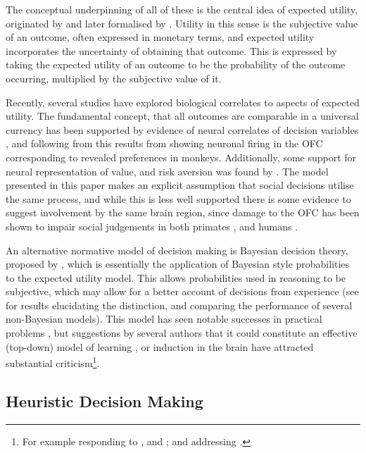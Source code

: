 The conceptual underpinning of all of these is the central idea of expected utility, originated by \citet{Bernoulli1954} and later formalised by \citet{Neumann1953}. Utility in this sense is the subjective value of an outcome, often expressed in monetary terms, and expected utility incorporates the uncertainty of obtaining that outcome. This is expressed by taking the expected utility of an outcome to be the probability of the outcome occurring, multiplied by the subjective value of it.

Recently, several studies have explored biological correlates to aspects of expected utility. The fundamental concept, that all outcomes are comparable in a universal currency has been supported by evidence of neural correlates of decision variables \citep{Platt1999}, and following from this results from \citet{Padoa-Schioppa2006,Padoa-Schioppa2008} showing neuronal firing in the \ac{OFC} corresponding to revealed preferences in monkeys. Additionally, some support for neural representation of value, and risk aversion was found by \citet{Christopoulos2009}. The model presented in this paper makes an explicit assumption that social decisions utilise the same process, and while this is less well supported there is some evidence to suggest involvement by the same brain region, since damage to the \ac{OFC} has been shown to impair social judgements in both primates \citep{Watson2012}, and humans \citep{Willis2010}.

An alternative normative model of decision making is Bayesian decision theory, proposed by \citet{Robbins1964}, which is essentially the application of Bayesian style probabilities to the expected utility model. This allows probabilities used in reasoning to be subjective, which may allow for a better account of decisions from experience (see \citet{Hertwig2004,Hau2008} for results elucidating the distinction, and comparing the performance of several non-Bayesian models). This model has seen notable successes in practical problems \citep{McNamara1980,Kristensen1997,Survey2003}, but suggestions by several authors  that it could constitute an effective (top-down) model of learning \citep{Tenenbaum2006,Griffiths2010}, or induction \citep{Gallistel2012} in the brain have attracted substantial criticism\footnote{For example \citet{Bowers2012} responding to \citet{Tenenbaum2006}, and \citet{Griffiths2010}; and \citet{Miller2012} addressing \citet{Gallistel2012}.}.

\subsection{Heuristic Decision Making}\label{sub:heuristic_theories}

